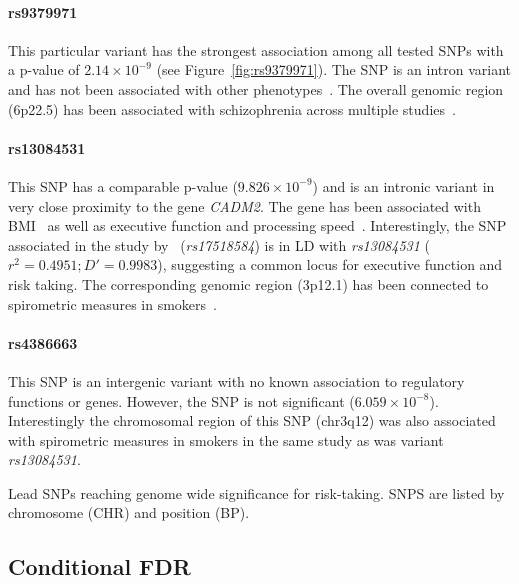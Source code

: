 \paragraph{rs9379971}
\label{par:rs9379971}
This particular variant has the strongest association among all tested SNPs with a p-value of $2.14\times10^{-9}$ (see Figure~\ref{fig:rs9379971}). 
The SNP is an intron variant and has not been associated with other phenotypes~\cite{Welter2014}.
The overall genomic region (6p22.5) has been associated with schizophrenia across multiple studies~\cite{Aberg2013,Shi2009}.

\paragraph{rs13084531}
\label{par:rs13084531}
This SNP has a comparable p-value ($9.826\times10^{-9}$) and is an intronic variant in very close proximity to the gene \textit{CADM2}.
The gene has been associated with BMI~\cite{Speliotes2010} as well as executive function and processing speed~\cite{Ibrahim-Verbaas2015}.
Interestingly, the SNP associated in the study by~\cite{Ibrahim-Verbaas2015} (\textit{rs17518584}) is in LD with \textit{rs13084531} ($r^2=0.4951;D'=0.9983$), suggesting a common locus for executive function and risk taking.
The corresponding genomic region (3p12.1) has been connected to spirometric measures in smokers~\cite{Lutz2015}.

\paragraph{rs4386663}
\label{par:rs4386663}
This SNP is an intergenic variant with no known association to regulatory functions or genes.
However, the SNP is not significant ($6.059\times10^{-8}$).
Interestingly the chromosomal region of this SNP (chr3q12) was also associated with spirometric measures in smokers in the same study as was variant \textit{rs13084531}.

\begin{table}
	\small
	\centering
	
  \caption[Lead SNPs]{
    Lead SNPs reaching genome wide significance for risk-taking.
    SNPS are listed by chromosome (CHR) and position (BP).
  }\label{tab:lead_snps_risk}
\end{table}

\subsection{Conditional FDR}
\label{sub:conditional_fdr}

